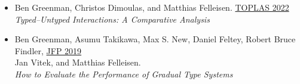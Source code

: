 \documentclass[11pt]{article}
\begin{document}



\begin{itemize}
\item
  Ben Greenman, Christos Dimoulas, and Matthias Felleisen. \hfill \href{}{TOPLAS 2022} \\
  \emph{Typed--Untyped Interactions: A Comparative Analysis}
\item
  Ben Greenman, Asumu Takikawa, Max S. New, Daniel Feltey, Robert Bruce Findler, \hfill \href{https://www.cambridge.org/core/journals/journal-of-functional-programming/article/abs/how-to-evaluate-the-performance-of-gradual-type-systems/DC765724C52A3A462F16C7FB3AD18697}{JFP 2019} \\
  Jan Vitek, and Matthias Felleisen. \\
  \emph{How to Evaluate the Performance of Gradual Type Systems}
\end{itemize}
\end{document}
